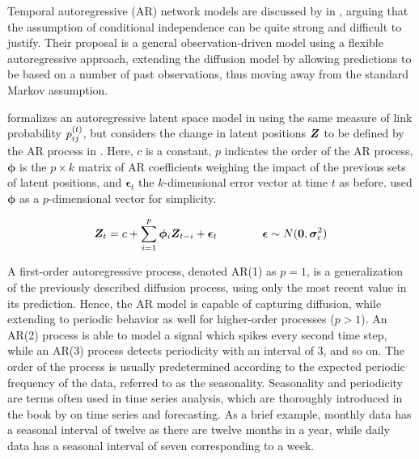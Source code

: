     Temporal autoregressive (AR) network models are discussed by \citeauthor{sewell2018simultaneous} in \cite{sewell2018simultaneous}, arguing that the assumption of conditional independence can be quite strong and difficult to justify. Their proposal is a general observation-driven model using a flexible autoregressive approach, extending the diffusion model by allowing predictions to be based on a number of past observations, thus moving away from the standard Markov assumption. 
    
    \citeauthor{zangenberg2018a} formalizes an autoregressive latent space model in \cite{zangenberg2018a} using the same measure of link probability $\sub(p)^\t$, but considers the change in latent positions $\bm{Z}$ to be defined by the AR process in . Here, $c$ is a constant, $p$ indicates the order of the AR process, $\bm{\phi}$ is the $p\times k$ matrix of AR coefficients weighing the impact of the previous sets of latent positions, and $\bm{\epsilon}_t$ the $k$-dimensional error vector at time $t$ as before. \citeauthor{zangenberg2018a} used $\bm{\phi}$ as a $p$-dimensional vector for simplicity.
    
    \begin{equation}\label{eq:ar-model}
        \bm{Z}_t = c+\sum_{i=1}^p \bm{\phi}_i \bm{Z}_{t-i} + \bm{\epsilon}_t \qquad\qquad \bm{\epsilon} \sim N(\bm{0},\bm{\sigma}_\epsilon^2)
    \end{equation}
    
    A first-order autoregressive process, denoted AR(1) as $p=1$, is a generalization of the previously described diffusion process, using only the most recent value in its prediction. Hence, the AR model is capable of capturing diffusion, while extending to periodic behavior as well for higher-order processes ($p>1$). 
    An AR(2) process is able to model a signal which spikes every second time step, while an AR(3) process detects periodicity with an interval of 3, and so on. 
    The order of the process is usually predetermined according to the expected periodic frequency of the data, referred to as the seasonality.
    Seasonality and periodicity are terms often used in time series analysis, which are thoroughly introduced in the book \cite{brockwell2016introduction} by \citeauthor{brockwell2016introduction} on time series and forecasting.
    As a brief example, monthly data has a seasonal interval of twelve as there are twelve months in a year, while daily data has a seasonal interval of seven corresponding to a week.
    
